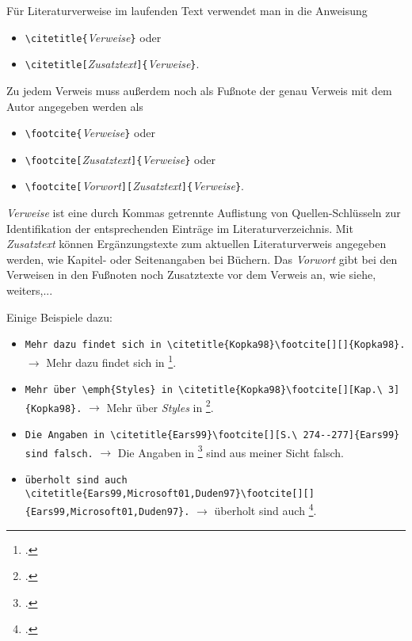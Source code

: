 Für Literaturverweise im laufenden Text verwendet man in \latex die Anweisung
\begin{itemize}
\item[] \verb!\citetitle{!\textit{Verweise}\verb!}! oder
\item[] \verb!\citetitle[!\textit{Zusatztext}\verb!]{!\textit{Verweise}\verb!}!.
\end{itemize}

\noindent%
Zu jedem Verweis muss außerdem noch als Fußnote der genau Verweis mit dem Autor angegeben werden als

\begin{itemize}
\item[] \verb!\footcite{!\textit{Verweise}\verb!}! oder
\item[] \verb!\footcite[!\textit{Zusatztext}\verb!]{!\textit{Verweise}\verb!}! oder
\item[] \verb!\footcite[!\textit{Vorwort}\verb!][!\textit{Zusatztext}\verb!]{!\textit{Verweise}\verb!}!.
\end{itemize}

\noindent%
\textit{Verweise} ist eine durch Kommas getrennte Auflistung von Quellen-Schlüsseln
zur Identifikation der entsprechenden Einträge im Literaturverzeichnis.
Mit \textit{Zusatztext} können Ergänzungstexte zum aktuellen Literaturverweis angegeben
werden, wie \zB Kapitel- oder Seitenangaben bei Büchern. Das \textit{Vorwort} gibt bei den Verweisen in den Fußnoten noch Zusatztexte vor dem Verweis an, wie \zB siehe, weiters,...

Einige Beispiele dazu:
\begin{itemize}
\item[] \verb!Mehr dazu findet sich in \citetitle{Kopka98}\footcite[][]{Kopka98}.! \newline
      $\rightarrow$ Mehr dazu findet sich in \footcite[][]{Kopka98}.
\item[] \verb!Mehr über \emph{Styles} in \citetitle{Kopka98}\footcite[][Kap.\ 3]{Kopka98}.! \newline
      $\rightarrow$ Mehr über \emph{Styles} in \footcite[][Kap.\ 3]{Kopka98}.
\item[] \verb!Die Angaben in \citetitle{Ears99}\footcite[][S.\ 274--277]{Ears99} sind falsch.! \newline
      $\rightarrow$ Die Angaben in \footcite[][S.\ 274--277]{Ears99} sind aus meiner Sicht falsch.
\item[] \verb!überholt sind auch \citetitle{Ears99,Microsoft01,Duden97}!\newline\verb!\footcite[][]{Ears99,Microsoft01,Duden97}.! \newline
      $\rightarrow$ überholt sind auch \footcite[][]{Ears99,Microsoft01,Duden97}.
\end{itemize}



